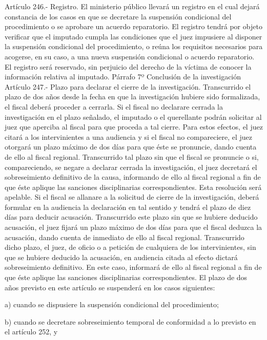    Artículo 246.- Registro. El ministerio público llevará un registro en el cual dejará constancia de los casos en que se decretare la suspensión condicional del procedimiento o se aprobare un acuerdo reparatorio.
    El registro tendrá por objeto verificar que el imputado cumpla las condiciones que el juez impusiere al disponer la suspensión condicional del procedimiento, o reúna los requisitos necesarios para acogerse, en su caso, a una nueva suspensión condicional o acuerdo reparatorio.
    El registro será reservado, sin perjuicio del derecho de la víctima de conocer la información relativa al imputado.
    Párrafo 7º Conclusión de la investigación
    Artículo 247.- Plazo para declarar el cierre de la investigación. Transcurrido el plazo de dos años desde la fecha en que la investigación hubiere sido formalizada, el fiscal deberá proceder a cerrarla.
    Si el fiscal no declarare cerrada la investigación en el plazo señalado, el imputado o el querellante podrán solicitar al juez que aperciba al fiscal para que proceda a tal cierre.
    Para estos efectos, el juez citará a los intervinientes a una audiencia y si el fiscal no compareciere, el juez otorgará un plazo máximo de dos días para que éste se pronuncie, dando cuenta de ello al fiscal regional. Transcurrido tal plazo sin que el fiscal se pronuncie o si, compareciendo, se negare a declarar cerrada la investigación, el juez decretará el sobreseimiento definitivo de la causa, informando de ello al fiscal regional a fin de que éste aplique las sanciones disciplinarias correspondientes. Esta resolución será apelable.
    Si el fiscal se allanare a la solicitud de cierre de la investigación, deberá formular en la audiencia la declaración en tal sentido y tendrá el plazo de diez días para deducir acusación.
    Transcurrido este plazo sin que se hubiere deducido acusación, el juez fijará un plazo máximo de dos días para que el fiscal deduzca la acusación, dando cuenta de inmediato de ello al fiscal regional. Transcurrido dicho plazo, el juez, de oficio o a petición de cualquiera de los intervinientes, sin que se hubiere deducido la acusación, en audiencia citada al efecto dictará sobreseimiento definitivo. En este caso, informará de ello al fiscal regional a fin de que éste aplique las sanciones disciplinarias correspondientes.
    El plazo de dos años previsto en este artículo se suspenderá en los casos siguientes:

    a) cuando se dispusiere la suspensión condicional
del procedimiento;

    b) cuando se decretare sobreseimiento temporal de
conformidad a lo previsto en el artículo 252, y

